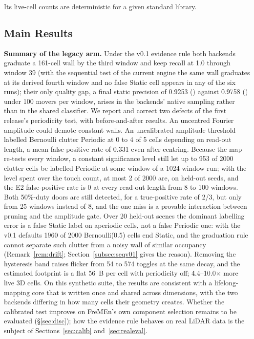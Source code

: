 \EfourSetup{} Its live-cell counts are deterministic for a given standard library.

\subsection{Main Results}\label{subsec:main}

\noindent\textbf{Summary of the legacy arm.} Under the v0.1 evidence rule both backends graduate a 161-cell wall by the third window and keep recall at 1.0 through window 39 (with the sequential test of the current engine the same wall graduates at its derived fourth window and no false Static cell appears in any of the six runs); their only quality gap, a final static precision of 0.9253 () against 0.9758 () under 100 movers per window, arises in the backends' native sampling rather than in the shared classifier. We report and correct two defects of the first release's periodicity test, with before-and-after results. An uncentred Fourier amplitude could demote constant walls. An uncalibrated amplitude threshold labelled Bernoulli clutter Periodic at 0 to 4 of 5 cells depending on read-out length, a mean false-positive rate of 0.331 even after centring. Because the map re-tests every window, a constant significance level still let up to 953 of 2000 clutter cells be labelled Periodic at some window of a 1024-window run; with the level spent over the touch count, at most 2 of 2000 are, on held-out seeds, and the E2 false-positive rate is 0 at every read-out length from 8 to 100 windows. Both 50\%-duty doors are still detected, for a true-positive rate of 2/3, but only from 25 windows instead of 8, and the one miss is a provable interaction between pruning and the amplitude gate. Over 20 held-out scenes the dominant labelling error is a false Static label on aperiodic cells, not a false Periodic one: with the v0.1 defaults 1960 of 2000 Bernoulli(0.5) cells end Static, and the graduation rule cannot separate such clutter from a noisy wall of similar occupancy (Remark~\ref{rem:drift}; Section~\ref{subsec:seqv01} gives the reason). Removing the hysteresis band raises flicker from 54 to 574 toggles at the same decay, and the estimated footprint is a flat 56~B per cell with periodicity off; \EfourIntro{} 4.4--10.0$\times$ more live 3D cells. On this synthetic suite, the results are consistent with a lifelong-mapping core that is written once and shared across dimensions, with the two backends differing in how many cells their geometry creates. Whether the calibrated test improves on FreMEn's own component selection remains to be evaluated (\S\ref{sec:disc}); how the evidence rule behaves on real LiDAR data is the subject of Sections~\ref{sec:calib} and~\ref{sec:realeval}.

